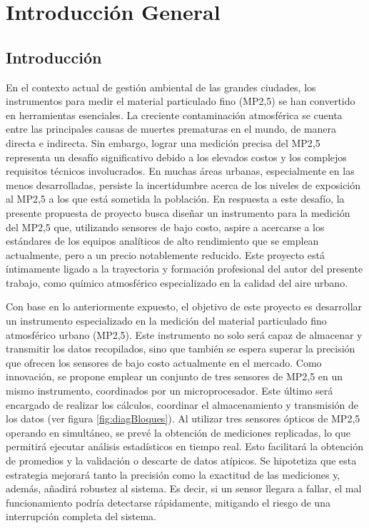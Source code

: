 
\chapter{Introducción General}
\section{Introducción}

En el contexto actual de gestión ambiental de las grandes ciudades, los instrumentos para medir el material particulado fino (MP2,5) se han convertido en herramientas esenciales. La creciente contaminación atmosférica se cuenta entre las principales causas de muertes prematuras en el mundo, de manera directa e indirecta. Sin embargo, lograr una medición precisa del MP2,5 representa un desafío significativo debido a los elevados costos y los complejos requisitos técnicos involucrados. En muchas áreas urbanas, especialmente en las menos desarrolladas, persiste la incertidumbre acerca de los niveles de exposición al MP2,5 a los que está sometida la población. En respuesta a este desafío, la presente propuesta de proyecto busca diseñar un instrumento para la medición del MP2,5 que, utilizando sensores de bajo costo, aspire a acercarse a los estándares de los equipos analíticos de alto rendimiento que se emplean actualmente, pero a un precio notablemente reducido. Este proyecto está íntimamente ligado a la trayectoria y formación profesional del autor del presente trabajo, como químico atmosférico especializado en la calidad del aire urbano.

Con base en lo anteriormente expuesto, el objetivo de este proyecto es desarrollar un instrumento especializado en la medición del material particulado fino atmosférico urbano (MP2,5). Este instrumento no solo será capaz de almacenar y transmitir los datos recopilados, sino que también se espera superar la precisión que ofrecen los sensores de bajo costo actualmente en el mercado. Como innovación, se propone emplear un conjunto de tres sensores de MP2,5 en un mismo instrumento, coordinados por un microprocesador. Este último será encargado de realizar los cálculos, coordinar el almacenamiento y transmisión de los datos (ver figura \ref{fig:diagBloques}). Al utilizar tres sensores ópticos de MP2,5 operando en simultáneo, se prevé la obtención de mediciones replicadas, lo que permitirá ejecutar análisis estadísticos en tiempo real. Esto facilitará la obtención de promedios y la validación o descarte de datos atípicos. Se hipotetiza que esta estrategia mejorará tanto la precisión como la exactitud de las mediciones y, además, añadirá robustez al sistema. Es decir, si un sensor llegara a fallar, el mal funcionamiento podría detectarse rápidamente, mitigando el riesgo de una interrupción completa del sistema.

